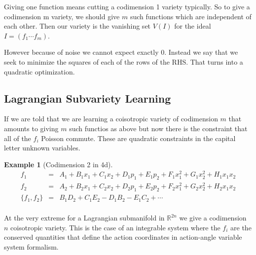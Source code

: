\documentclass[a4paper,landscape]{article}
\theoremstyle{change}
\newtheorem{example}[equation]{Example}
\theoremstyle{nonumberplain}
\numberwithin{equation}{section}
\newcommand\setof[1]{\{ #1 \}}
\begin{document}
Giving one function means cutting a codimension 1 variety typically. So to give a codimension m variety, we should give $m$ such functions which are independent of each other. Then our variety is the vanishing set $V(I)$ for the ideal $I = (f_1 \cdots f_m)$.

However because of noise we cannot expect exactly $0$. Instead we say that we seek to minimize the squares of each of the rows of the RHS. That turns into a quadratic optimization.

\subsection{Lagrangian Subvariety Learning}

If we are told that we are learning a coisotropic variety of codimension $m$ that amounts to giving $m$ such functios as above but now there is the constraint that all of the $f_i$ Poisson commute. These are quadratic constraints in the capital letter unknown variables.

\begin{example}[Codimension 2 in 4d]

\begin{eqnarray*}
f_1 &=& A_1 + B_1 x_1 + C_1 x_2 + D_1 p_1 + E_1 p_2 + F_1 x_1^2 + G_1 x_2^2 + H_1 x_1 x_2\\
f_2 &=& A_2 + B_2 x_1 + C_2 x_2 + D_2 p_1 + E_2 p_2 + F_2 x_1^2 + G_2 x_2^2 + H_2 x_1 x_2\\
\setof{ f_1 , f_2 } &=& B_1 D_2 + C_1 E_2 - D_1 B_2 - E_1 C_2 + \cdots\\
\end{eqnarray*}

\end{example}

At the very extreme for a Lagrangian submanifold in $\mathbb{R}^{2n}$ we give a codimension $n$ coisotropic variety. This is the case of an integrable system where the $f_i$ are the conserved quantities that define the action coordinates in action-angle variable system formalism.
\end{document}
